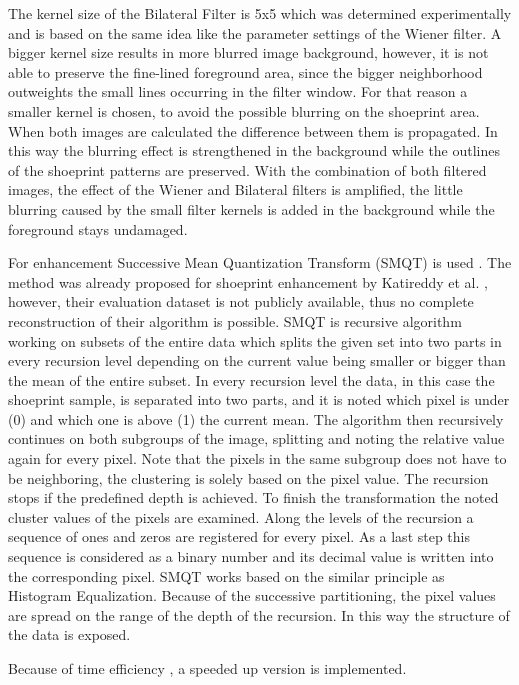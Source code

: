 \documentclass[draft,final]{vutinfth} %
\begin{document}
The kernel size of the Bilateral Filter is 5x5 which was determined experimentally and is based on the same idea like the parameter settings of the Wiener filter.
A bigger kernel size results in more blurred image background, however, it is not able to preserve the fine-lined foreground area, since the bigger neighborhood outweights the small lines occurring in the filter window.
For that reason a smaller kernel is chosen, to avoid the possible blurring on the shoeprint area.
When both images are calculated the difference between them is propagated.
In this way the blurring effect is strengthened in the background while the outlines of the shoeprint patterns are preserved.
With the combination of both filtered images, the effect of the Wiener and Bilateral filters is amplified, the little blurring caused by the small filter kernels is added in the background while the foreground stays undamaged.
\par
For enhancement Successive Mean Quantization Transform (SMQT) is used \cite{nilsson2013smqt}.
The method was already proposed for shoeprint enhancement by Katireddy et al. \cite{katireddy2017novel}, however, their evaluation dataset  is not publicly available, thus no complete reconstruction of their algorithm is possible.
SMQT is recursive algorithm working on subsets of the entire data which splits the given set into two parts in every recursion level depending on the current value being smaller or bigger than the mean of the entire subset.
In every recursion level the data, in this case the shoeprint sample, is separated into two parts, and it is noted which pixel is under (0) and which one is above (1) the current mean.
The algorithm then recursively continues on both subgroups of the image, splitting and noting the relative value again for every pixel.
Note that the pixels in the same subgroup does not have to be neighboring, the clustering is solely based on the pixel value.
The recursion stops if the predefined depth is achieved.
To finish the transformation the noted cluster values of the pixels are examined.
Along the levels of the recursion a sequence of ones and zeros are registered for every pixel.
As a last step this sequence is considered as a binary number and its decimal value is written into the corresponding pixel.
SMQT works based on the similar principle as Histogram Equalization.
Because of the successive partitioning, the pixel values are spread on the range of the depth of the recursion.
In this way the structure of the data is exposed.
\par
Because of time efficiency , a speeded up version is implemented.
\end{document}
